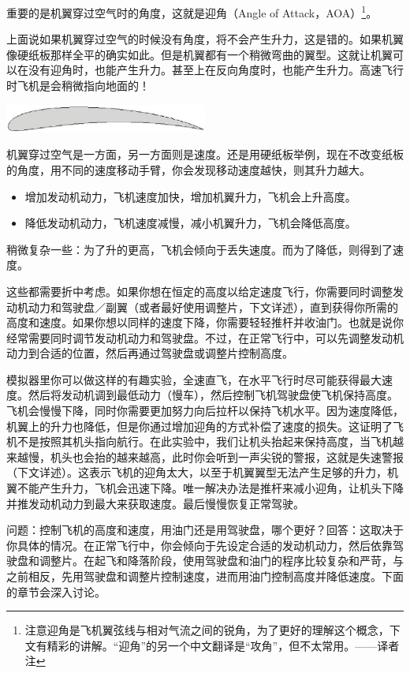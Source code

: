 重要的是机翼穿过空气时的角度，这就是迎角（Angle of Attack，AOA）\footnote{注意迎角是飞机翼弦线与相对气流之间的锐角，为了更好的理解这个概念，下文有精彩的讲解。“迎角”的另一个中文翻译是“攻角”，但不太常用。——译者注}。

上面说如果机翼穿过空气的时候没有角度，将不会产生升力，这是错的。如果机翼像硬纸板那样全平的确实如此。但是机翼都有一个稍微弯曲的翼型。这就让机翼可以在没有迎角时，也能产生升力。甚至上在反向角度时，也能产生升力。高速飞行时飞机是会稍微指向地面的！

\centerline{
  \includegraphics[width=0.5\textwidth]{img/basic_tutorial/airfoil}
}

机翼穿过空气是一方面，另一方面则是速度。还是用硬纸板举例，现在不改变纸板的角度，用不同的速度移动手臂，你会发现移动速度越快，则其升力越大。

\begin{itemize}
    \item 增加发动机动力，飞机速度加快，增加机翼升力，飞机会上升高度。
    \item 降低发动机动力，飞机速度减慢，减小机翼升力，飞机会降低高度。
\end{itemize}

稍微复杂一些：为了升的更高，飞机会倾向于丢失速度。而为了降低，则得到了速度。

这些都需要折中考虑。如果你想在恒定的高度以给定速度飞行，你需要同时调整发动机动力和驾驶盘／副翼（或者最好使用调整片，下文详述），直到获得你所需的高度和速度。如果你想以同样的速度下降，你需要轻轻推杆并收油门。也就是说你经常需要同时调节发动机动力和驾驶盘。不过，在正常飞行中，可以先调整发动机动力到合适的位置，然后再通过驾驶盘或调整片控制高度。

模拟器里你可以做这样的有趣实验，全速直飞，在水平飞行时尽可能获得最大速度。然后将发动机调到最低动力（慢车），然后控制飞机驾驶盘使飞机保持高度。飞机会慢慢下降，同时你需要更加努力向后拉杆以保持飞机水平。因为速度降低，机翼上的升力也降低，但是你通过增加迎角的方式补偿了速度的损失。这证明了飞机不是按照其机头指向航行。在此实验中，我们让机头抬起来保持高度，当飞机越来越慢，机头也会抬的越来越高，此时你会听到一声尖锐的警报，这就是失速警报（下文详述）。这表示飞机的迎角太大，以至于机翼翼型无法产生足够的升力，机翼不能产生升力，飞机会迅速下降。唯一解决办法是推杆来减小迎角，让机头下降并推发动机动力到最大来获取速度。最后慢慢恢复正常驾驶。

问题：控制飞机的高度和速度，用油门还是用驾驶盘，哪个更好？回答：这取决于你具体的情况。在正常飞行中，你会倾向于先设定合适的发动机动力，然后依靠驾驶盘和调整片。在起飞和降落阶段，使用驾驶盘和油门的程序比较复杂和严苛，与之前相反，先用驾驶盘和调整片控制速度，进而用油门控制高度并降低速度。下面的章节会深入讨论。

